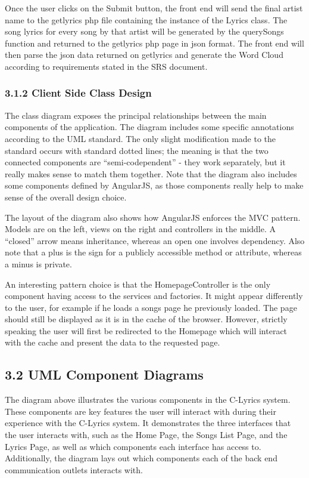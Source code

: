 \documentclass[]{article}
\begin{document}
Once the user clicks on the Submit button, the front end will send the
final artist name to the getlyrics php file containing the instance of
the Lyrics class. The song lyrics for every song by that artist will be
generated by the querySongs function and returned to the getlyrics php
page in json format. The front end will then parse the json data
returned on getlyrics and generate the Word Cloud according to
requirements stated in the SRS document.

\subsubsection{3.1.2 Client Side Class
Design}\label{client-side-class-design}

The class diagram exposes the principal relationships between the main
components of the application. The diagram includes some specific
annotations according to the UML standard. The only slight modification
made to the standard occurs with standard dotted lines; the meaning is
that the two connected components are ``semi-codependent'' - they work
separately, but it really makes sense to match them together. Note that
the diagram also includes some components defined by AngularJS, as those
components really help to make sense of the overall design choice.

The layout of the diagram also shows how AngularJS enforces the MVC
pattern. Models are on the left, views on the right and controllers in
the middle. A ``closed'' arrow means inheritance, whereas an open one
involves dependency. Also note that a plus is the sign for a publicly
accessible method or attribute, whereas a minus is private.

An interesting pattern choice is that the HomepageController is the only
component having access to the services and factories. It might appear
differently to the user, for example if he loads a songs page he
previously loaded. The page should still be displayed as it is in the
cache of the browser. However, strictly speaking the user will first be
redirected to the Homepage which will interact with the cache and
present the data to the requested page.

\subsection{3.2 UML Component Diagrams}\label{uml-component-diagrams}

The diagram above illustrates the various components in the C-Lyrics
system. These components are key features the user will interact with
during their experience with the C-Lyrics system. It demonstrates the
three interfaces that the user interacts with, such as the Home Page,
the Songs List Page, and the Lyrics Page, as well as which components
each interface has access to. Additionally, the diagram lays out which
components each of the back end communication outlets interacts with.
\end{document}

